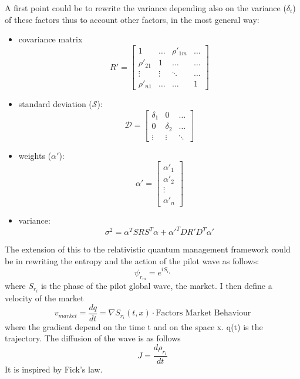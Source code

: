 \documentclass{article}
\begin{document}
A first point could be to rewrite the variance depending also on the variance ($\delta_i$) of these factors thus to account other factors, in the most general way:
\begin{itemize}
    \item covariance matrix
    $$R\prime=\begin{bmatrix}1 & \dots & \rho\prime_{1m} & \dots \\ \rho\prime_{21} & 1 & \dots & \dots \\ \vdots & \vdots & \ddots & \dots \\ \rho\prime_{n1} & \dots & \dots & 1\end{bmatrix}$$

    \item standard deviation ($\mathcal{S}$):
    $$\mathcal{D}=\begin{bmatrix}\delta_{1} & 0 & \dots \\ 0 & \delta_{2} & \dots \\ \vdots & \vdots & \ddots \end{bmatrix}$$

    \item weights ($\alpha\prime$):
    $$\alpha\prime=\begin{bmatrix}\alpha\prime_{1}\\ \alpha\prime_{2}\\ \vdots \\ \alpha\prime_{n}\end{bmatrix}$$
    
    \item variance:
    $$\sigma^{2}=\alpha^{T}S R S^{T}\alpha + \alpha\prime^T D R\prime D^T \alpha\prime$$
\end{itemize}

The extension of this to the relativistic quantum management framework could be in rewriting the entropy and the action of the pilot wave as follows:
\begin{equation}
    \psi_{r_m} = e^{iS_{r_i}}
\end{equation}
where $S_{r_i}$ is the phase of the pilot global wave, the market.
I then define a velocity of the market
\begin{equation}
   v_{market} =  \frac{dq}{dt} =  \nabla{S_{r_i}(t, x)} \cdot {\text{Factors Market Behaviour}}
\end{equation}
where the gradient depend on the time t and on the space x. q(t) is the trajectory.
The diffusion of the wave is as follows
\begin{equation}
    J = \frac{d \rho_{r_i}}{dt}
\end{equation}
It is inspired by Fick's law.
\end{document}
